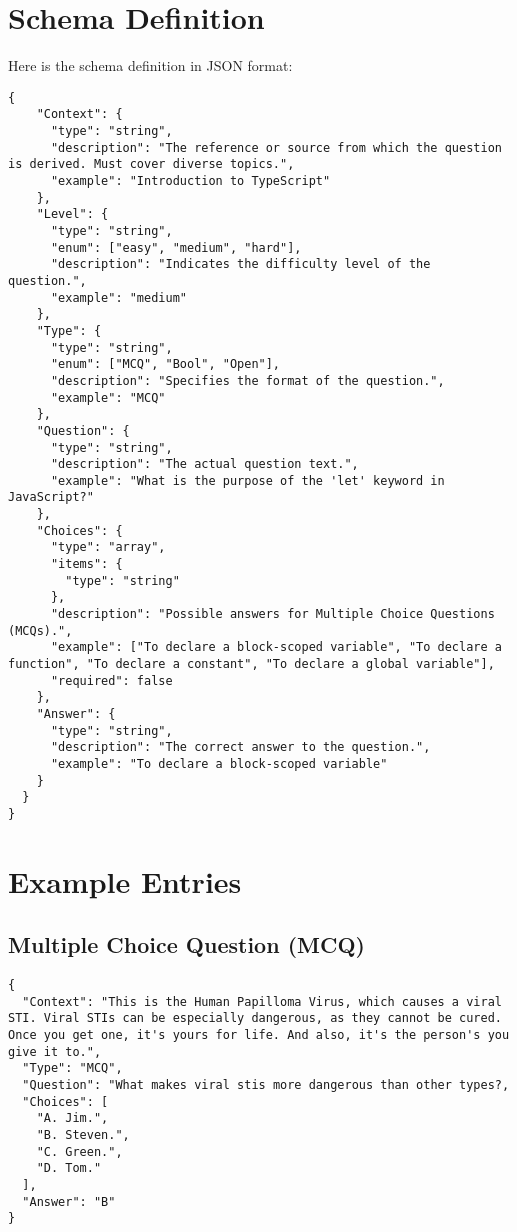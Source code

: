 \newpage
\section*{Schema Definition}

Here is the schema definition in JSON format:


\begin{verbatim}
{
    "Context": {
      "type": "string",
      "description": "The reference or source from which the question is derived. Must cover diverse topics.",
      "example": "Introduction to TypeScript"
    },
    "Level": {
      "type": "string",
      "enum": ["easy", "medium", "hard"],
      "description": "Indicates the difficulty level of the question.",
      "example": "medium"
    },
    "Type": {
      "type": "string",
      "enum": ["MCQ", "Bool", "Open"],
      "description": "Specifies the format of the question.",
      "example": "MCQ"
    },
    "Question": {
      "type": "string",
      "description": "The actual question text.",
      "example": "What is the purpose of the 'let' keyword in JavaScript?"
    },
    "Choices": {
      "type": "array",
      "items": {
        "type": "string"
      },
      "description": "Possible answers for Multiple Choice Questions (MCQs).",
      "example": ["To declare a block-scoped variable", "To declare a function", "To declare a constant", "To declare a global variable"],
      "required": false
    },
    "Answer": {
      "type": "string",
      "description": "The correct answer to the question.",
      "example": "To declare a block-scoped variable"
    }
  }
}
\end{verbatim}

\section*{Example Entries}

\subsection*{Multiple Choice Question (MCQ)}

\begin{verbatim}
{
  "Context": "This is the Human Papilloma Virus, which causes a viral STI. Viral STIs can be especially dangerous, as they cannot be cured. Once you get one, it's yours for life. And also, it's the person's you give it to.",
  "Type": "MCQ",
  "Question": "What makes viral stis more dangerous than other types?,
  "Choices": [
    "A. Jim.",
    "B. Steven.",
    "C. Green.",
    "D. Tom."
  ],
  "Answer": "B"
}
\end{verbatim}

